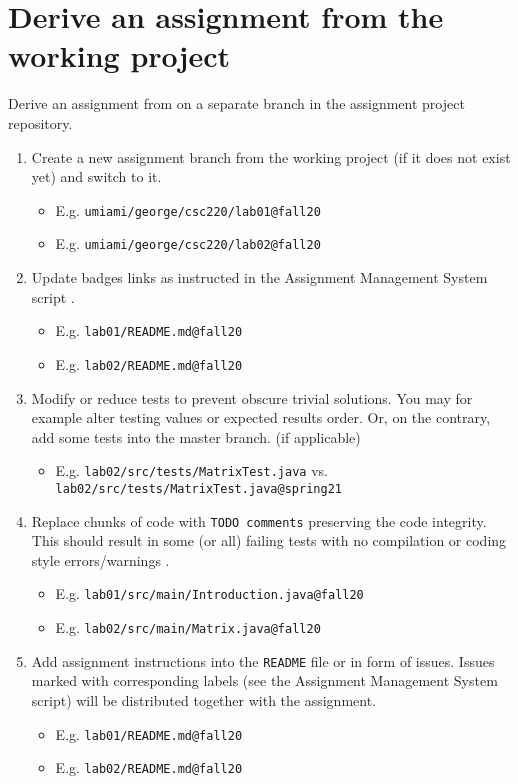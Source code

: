\section{Derive an assignment from the working project} \label{ssec:deriveassn}

{Derive an assignment from on a separate branch in the assignment project repository.}

\begin{enumerate}
\item
 {Create a new assignment branch from the working project (if it does not exist yet) and switch to it.}
    \begin{itemize}
    \item
      {E.g. \texttt{umiami/george/csc220/lab01@fall20}}
    \item
      {E.g. \texttt{umiami/george/csc220/lab02@fall20}}
    \end{itemize}

\item
  {Update badges links as instructed in the Assignment Management System script .}
    \begin{itemize}
    \item
      {E.g. \texttt{lab01/README.md@fall20}}
    \item
      {E.g. \texttt{lab02/README.md@fall20}}
    \end{itemize}

\item
  {Modify or reduce tests to prevent obscure trivial solutions. You may for example alter testing values or expected results order. Or, on the contrary, add some tests into the master branch. (if applicable)}
    \begin{itemize}
    \item
      {E.g. \texttt{lab02/src/tests/MatrixTest.java} vs. \texttt{lab02/src/tests/MatrixTest.java@spring21}}
    \end{itemize}

\item
  {Replace chunks of code with \texttt{TODO comments} preserving the code integrity. This should result in some (or all) failing tests with no compilation or coding style errors/warnings .}
    \begin{itemize}
    \item
      {E.g. \texttt{lab01/src/main/Introduction.java@fall20}}
    \item
      {E.g. \texttt{lab02/src/main/Matrix.java@fall20}}
    \end{itemize}

\item
  {Add assignment instructions into the \texttt{README} file or in form of issues. Issues marked with corresponding labels (see the Assignment Management System script) will be distributed together with the assignment.}
    \begin{itemize}
    \item
      {E.g. \texttt{lab01/README.md@fall20}}
    \item
      {E.g. \texttt{lab02/README.md@fall20}}
    \end{itemize}
\end{enumerate}

